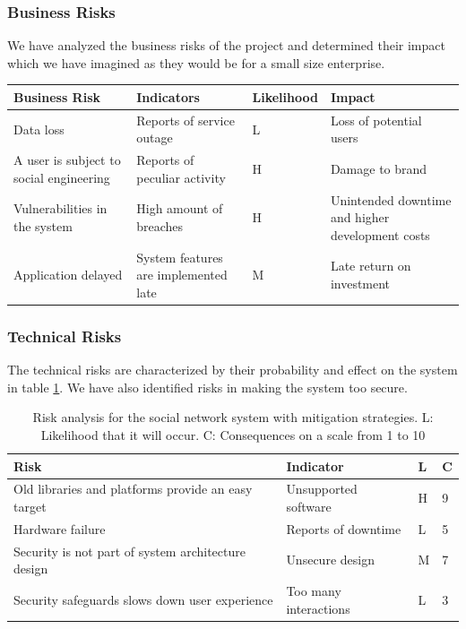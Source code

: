 \documentclass[a4paper]{article}
\begin{document}
\subsubsection{Business Risks}
We have analyzed the business risks of the project and determined their impact which we have imagined as they would be for a small size enterprise.
\begin{table}[h!]
\begin{tabular}{| p{4cm} | p{3cm} | l | p{3cm} |}
\hline
\textbf{Business Risk} & \textbf{Indicators} & \textbf{Likelihood} & \textbf{Impact} \\ \hline
Data loss & Reports of service outage & L & Loss of potential users\\\hline
A user is subject to social engineering & Reports of peculiar activity & H & Damage to brand \\\hline
Vulnerabilities in the system & High amount of breaches & H & Unintended downtime and higher development costs \\\hline
Application delayed & System features are implemented late & M & Late return on investment \\\hline
\end{tabular}
\end{table}


\subsubsection{Technical Risks}
The technical risks are characterized by their probability and effect on the system in table \ref{tab:risk_analysis}. We have also identified risks in making the system too secure.

\begin{table}[h!]
	\begin{tabular}{| l | p{3cm} | l | l |}
		\hline
		\textbf{Risk} & \textbf{Indicator} & \textbf{L} & \textbf{C}  \\ \hline
        Old libraries and platforms provide an easy target & Unsupported software & H & 9 \\\hline
        Hardware failure & Reports of downtime & L & 5 \\ \hline
        Security is not part of system architecture design & Unsecure design & M & 7 \\ \hline
		Security safeguards slows down user experience & Too many interactions & L & 3
		\\ \hline
	\end{tabular}
	\caption{Risk analysis for the social network system with mitigation strategies. L: Likelihood that it will occur. C: Consequences on a scale from 1 to 10}
	\label{tab:risk_analysis}
\end{table}
\end{document}
